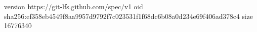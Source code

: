 version https://git-lfs.github.com/spec/v1
oid sha256:ef358eb4549f8aa9957d9792f7c023531f1f68dc6b08a0d234e69f406ad378c4
size 16776340
